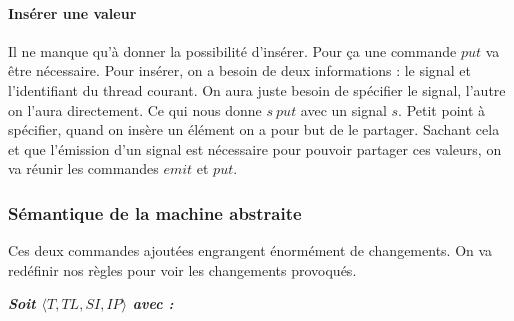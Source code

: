 \documentclass[10pt,a4paper]{article}
\begin{document}
					
				\paragraph{Insérer une valeur}
				
					Il ne manque qu'à donner la possibilité d'insérer. Pour ça une commande $put$ va être nécessaire. Pour insérer, on a besoin de deux informations : le signal et l'identifiant du thread courant. On aura juste besoin de spécifier le signal, l'autre on l'aura directement. Ce qui nous donne $s~put$ avec un signal $s$. 
					\smallbreak
					Petit point à spécifier, quand on insère un élément on a pour but de le partager. Sachant cela et que l'émission d'un signal est nécessaire pour pouvoir partager ces valeurs, on va réunir les commandes $emit$ et $put$. 
					\bigbreak
					\bigbreak
						
				
			
			
			\subsubsection{Sémantique de la machine abstraite}
				
				Ces deux commandes ajoutées engrangent énormément de changements. On va redéfinir nos règles pour voir les changements provoqués. 
				\bigbreak
				
				\textbf{\textit{Soit $\langle T,TL,SI,IP\rangle$ avec :}}
				
\end{document}
